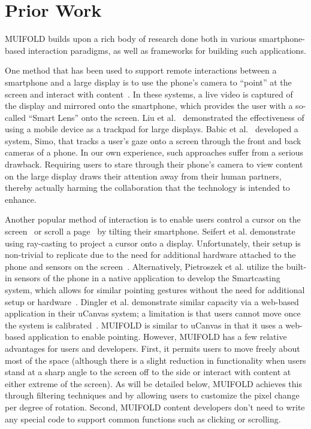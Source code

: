 \section{Prior Work}

MUIFOLD builds upon a rich body of research done both in
various smartphone-based interaction paradigms, as well as frameworks
for building such applications.

One method that has been used to support remote interactions between a smartphone and a large display is to use the
phone's camera to ``point'' at the screen and interact with
content~\cite{boring_touch_2010,jeon_interaction_2010}. In these
systems, a live video is captured of the display and mirrored onto
the smartphone, which provides the user with a
so-called ``Smart Lens'' onto the screen. Liu et al.~\cite{liu_effects_2014} demonstrated the effectiveness of using a
mobile device as a trackpad for large
displays. Babic et al.~\cite{babic_simo_2020} developed a system, Simo, that tracks a user's gaze onto a screen through the
front and back cameras of a phone. In our own experience, such approaches suffer from a serious drawback. Requiring users to stare through their phone's camera to view content on the large display draws their attention away from their human partners, thereby actually harming the collaboration that the technology is intended to enhance.

Another popular method of interaction is to enable users control a cursor on the
screen~\cite{boring_scroll_2009} or scroll a
page~\cite{oakley_tilt_2005} by tilting their smartphone. Seifert et al. demonstrate using ray-casting to project a cursor onto a display. Unfortunately,
their setup is non-trivial to replicate due to the need for
additional hardware attached to the phone and sensors on the
screen~\cite{seifert_pointerphone_2013}. Alternatively,
Pietroszek et al. utilize the built-in sensors of the phone in a
native application to develop the Smartcasting system, which
allows for similar pointing gestures without the need for
additional setup or hardware~\cite{pietroszek_smartcasting:_2014}.
Dingler et al. demonstrate  similar capacity via
a web-based application in their uCanvas system; a limitation is that users cannot move once the system is
calibrated~\cite{abascal_ucanvas_2015}. MUIFOLD is similar to uCanvas in that it uses a web-based application to enable pointing. However, MUIFOLD has a few relative advantages for users and developers. First, it permits users to move freely about most of the space (although there is a slight reduction in functionality when
users stand at a sharp angle to the screen off to the side or
interact with content at either extreme of the screen). As will be detailed below, MUIFOLD
achieves this through filtering techniques and by allowing users to customize the pixel change per degree of rotation. Second, MUIFOLD
content developers don't need to write any special code to support common functions such as clicking or scrolling.


